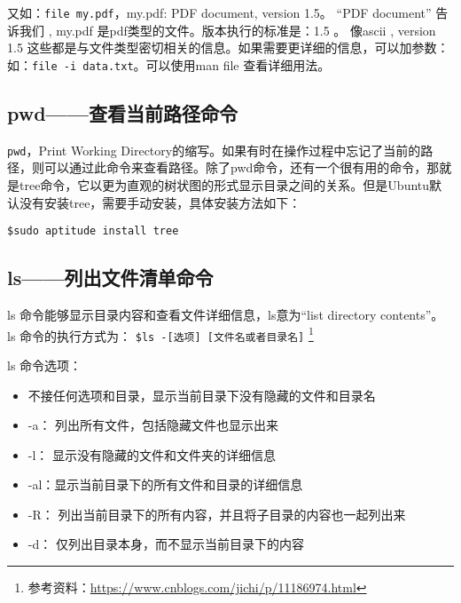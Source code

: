 又如：\verb*|file my.pdf|，my.pdf: PDF document, version 1.5。
“PDF document” 告诉我们 , my.pdf 是pdf类型的文件。版本执行的标准是：1.5 。
像ascii , version 1.5 这些都是与文件类型密切相关的信息。如果需要更详细的信息，可以加参数：如：\verb*|file -i data.txt|。可以使用man file 查看详细用法。


\subsection{pwd——查看当前路径命令}
\verb*|pwd|，Print Working Directory的缩写。如果有时在操作过程中忘记了当前的路径，则可以通过此命令来查看路径。除了pwd命令，还有一个很有用的命令，那就是tree命令，它以更为直观的树状图的形式显示目录之间的关系。但是Ubuntu默认没有安装tree，需要手动安装，具体安装方法如下：

\verb*|$sudo aptitude install tree|



\subsection{ls——列出文件清单命令}
ls 命令能够显示目录内容和查看文件详细信息，ls意为“list directory contents”。 ls 命令的执行方式为：
\verb*|$ls -[选项] [文件名或者目录名]|
\footnote{参考资料：\url{https://www.cnblogs.com/jichi/p/11186974.html} }

ls 命令选项：
\begin{itemize}
\item 不接任何选项和目录，显示当前目录下没有隐藏的文件和目录名
\item  -a： 列出所有文件，包括隐藏文件也显示出来
\item  -l： 显示没有隐藏的文件和文件夹的详细信息
\item -al：显示当前目录下的所有文件和目录的详细信息
\item -R： 列出当前目录下的所有内容，并且将子目录的内容也一起列出来
\item -d： 仅列出目录本身，而不显示当前目录下的内容
\end{itemize}

